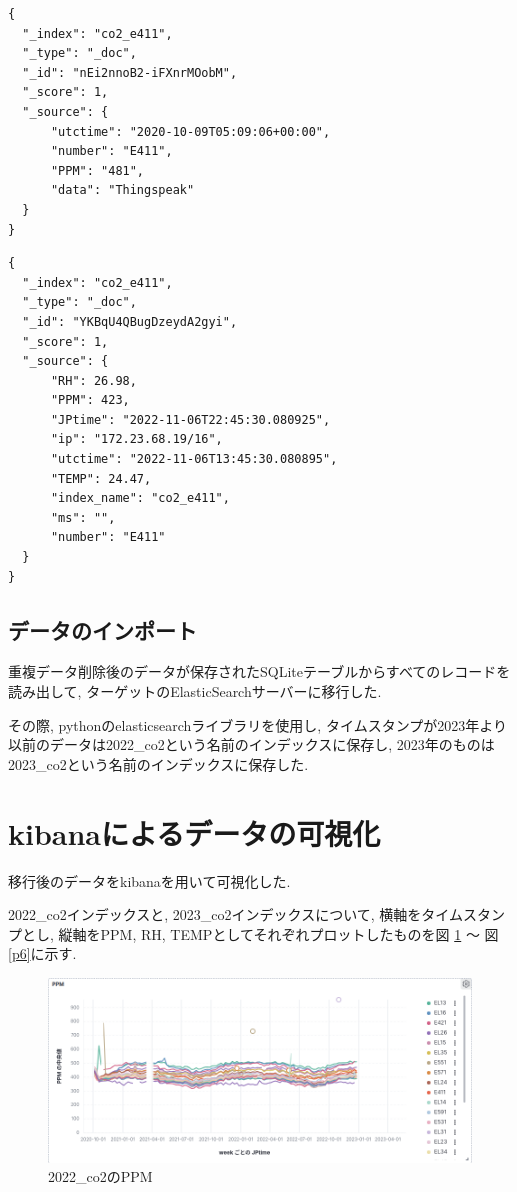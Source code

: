 \documentclass[a4j,12pt,]{jarticle}
\begin{document}
\begin{lstlisting}[caption=\_sourceフィールドのメンバー数が少ないドキュメント, label=sc1]
{
  "_index": "co2_e411",
  "_type": "_doc",
  "_id": "nEi2nnoB2-iFXnrMOobM",
  "_score": 1,
  "_source": {
      "utctime": "2020-10-09T05:09:06+00:00",
      "number": "E411",
      "PPM": "481",
      "data": "Thingspeak"
  }
}
  \end{lstlisting}

  \begin{lstlisting}[caption=\_sourceフィールドのメンバー数が多いドキュメント, label=sc2]
{
  "_index": "co2_e411",
  "_type": "_doc",
  "_id": "YKBqU4QBugDzeydA2gyi",
  "_score": 1,
  "_source": {
      "RH": 26.98,
      "PPM": 423,
      "JPtime": "2022-11-06T22:45:30.080925",
      "ip": "172.23.68.19/16",
      "utctime": "2022-11-06T13:45:30.080895",
      "TEMP": 24.47,
      "index_name": "co2_e411",
      "ms": "",
      "number": "E411"
  }
}
    \end{lstlisting}

\subsection{データのインポート}
重複データ削除後のデータが保存されたSQLiteテーブルからすべてのレコードを読み出して, ターゲットのElasticSearchサーバーに移行した.

その際, pythonのelasticsearchライブラリを使用し, タイムスタンプが2023年より以前のデータは2022\_co2という名前のインデックスに保存し, 2023年のものは2023\_co2という名前のインデックスに保存した.

\section{kibanaによるデータの可視化}

移行後のデータをkibanaを用いて可視化した.

2022\_co2インデックスと, 2023\_co2インデックスについて, 横軸をタイムスタンプとし, 縦軸をPPM, RH, TEMPとしてそれぞれプロットしたものを図 \ref{p1} 〜 図 \ref{p6}に示す.

\begin{figure}[H]
  \begin{center}
    \includegraphics[width=160mm]{2022_ppm.png}
    \caption{2022\_co2のPPM}
    \label{p1}
  \end{center}
\end{figure}
\end{document}
